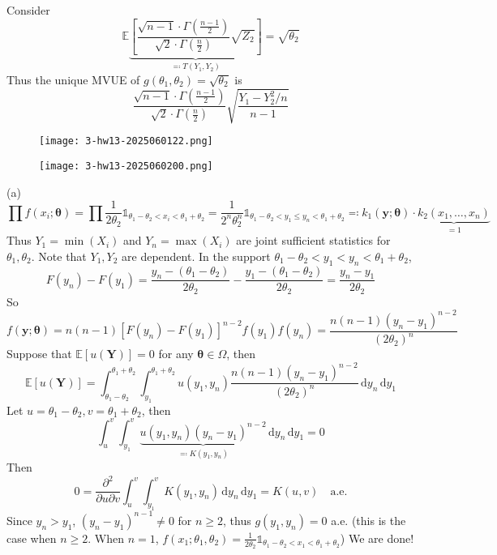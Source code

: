 Consider
\[
\mathbb{E}\underbrace{ \left[ \frac{\sqrt{ n-1 }\cdot\Gamma\left( \frac{n-1}{2} \right)}{\sqrt{ 2 }\cdot\Gamma\left( \frac{n}{2} \right)} \sqrt{ Z_2 }\right] }_{ \eqqcolon T(Y_1,Y_2) }=\sqrt{ \theta_2 }
\]
Thus the unique MVUE of $g(\theta_1,\theta_2)=\sqrt{ \theta_2 }$ is
\[
 \frac{\sqrt{ n-1 }\cdot\Gamma\left( \frac{n-1}{2} \right)}{\sqrt{ 2 }\cdot\Gamma\left( \frac{n}{2} \right)} \sqrt{ \frac{Y_1-Y_2^2/n }{n-1} }
\]
\begin{exercise}
\begin{figure}[H]
\centering
\texttt{[image: 3-hw13-2025060122.png]}
\label{}
\end{figure}
\end{exercise}
\begin{figure}[H]
\centering
\texttt{[image: 3-hw13-2025060200.png]}
\label{}
\end{figure}
(a)
\[
\prod f(x_i;\boldsymbol{\theta})=\prod\frac{1}{2\theta_2}\mathbb{1}_{\theta_1-\theta_2<x_i<\theta_1+\theta_2}=\frac{1}{2^{n}\theta_2^{n}}\mathbb{1}_{\theta_1-\theta_2<y_1\leq y_n<\theta_1+\theta_2}\eqqcolon k_1(\mathbf{y};\boldsymbol{\theta})\cdot \underbrace{ k_2(x_1,\dots, x_n) }_{ =1 }
\]
Thus $Y_1=\min(X_i)$ and $Y_n=\max(X_i)$ are joint sufficient statistics for $\theta_1,\theta_2$. Note that $Y_1,Y_2$ are dependent. In the support $\theta_1-\theta_2<y_1<y_n<\theta_1+\theta_2$,
\[
F(y_n)-F(y_1)=\frac{y_n-(\theta_1-\theta_2)}{2\theta_2}-\frac{y_1-(\theta_1-\theta_2)}{2\theta_2}=\frac{y_n-y_1}{2\theta_2}
\]
So
\[
f(\mathbf{y};\boldsymbol{\theta})=n(n-1)[F(y_n)-F(y_1)]^{n-2}f(y_1)f(y_n)=\frac{n(n-1)(y_n-y_1)^{n-2}}{(2\theta_2)^{n}}
\]
Suppose that $\mathbb{E}[u(\mathbf{Y})]=0$ for any $\boldsymbol{\theta}\in \Omega$, then
\[
\mathbb{E}[u(\mathbf{Y})]  =\int_{\theta_1-\theta_2}^{\theta_1+\theta_2 } \int_{y_1}^{\theta_1+\theta_2} u(y_1,y_n)\frac{n(n-1)(y_n-y_1)^{n-2}}{(2\theta_2)^{n}} \, \mathrm{d}y_n  \, \mathrm{d}y_1 
\]
Let $u=\theta_1-\theta_2,v=\theta_1+\theta_2$, then
\[
\int_{u}^{v} \int_{y_1}^{v}\underbrace{  u(y_1,y_n)(y_n-y_1)^{n-2} }_{ \eqqcolon K(y_1,y_n) } \, \mathrm{d}y_n  \, \mathrm{d}y_1=0 
\]
Then
\[
0=\frac{ \partial^2   }{ \partial u\partial v }\int_{u}^{v} \int_{y_1}^{v} K(y_1,y_n) \, \mathrm{d}y_n  \, \mathrm{d}y_1=K(u,v)\quad \text{a.e.}
\]
Since $y_n>y_1$, $(y_n-y_1)^{n-1}\neq0$ for $n\geq2$, thus $g(y_1,y_n)=0$ a.e. (this is the case when $n\geq2$. When $n=1$, $f(x_1;\theta_1,\theta_2)=\frac{1}{2\theta_2}\mathbb{1}_{\theta_1-\theta_2<x_1<\theta_1+\theta_2}$) We are done!

